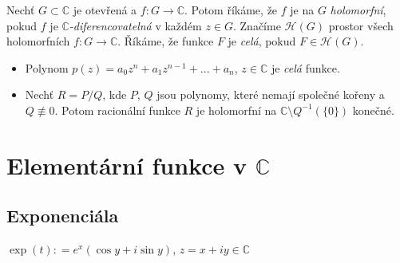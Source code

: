 
\begin{definition}
Nechť $G\subset \mathbb{C}$ je otevřená a $f \colon G \to \mathbb{C}$.
Potom říkáme, že $f$ je na $G$ \emph{holomorfní}, pokud $f$ je  $\mathbb{C}$\emph{-diferencovatelná} v každém $z\in {G}$. Značíme $\mathcal{H}(G)$ prostor všech holomorfních $f \colon G \to \mathbb{C}$. Říkáme, že funkce $F$ je \emph{celá}, pokud $F\in \mathcal{H}(G)$.
\end{definition}

\begin{example}\mbox{}
\begin{itemize}
    \item Polynom $p(z) = a_0z^{n}+a_1z^{n-1}+...+a_n$, $z\in \mathbb{C}$ je \emph{celá} funkce.
    \item Nechť $R=P/Q$, kde $P$, $Q$ jsou polynomy, které nemají společné kořeny a $Q\not\equiv 0$. Potom racionální funkce $R$ je holomorfní na $\mathbb{C}\setminus Q^{-1}(\{0\})$ konečné.
\end{itemize}    
\end{example}


\section{Elementární funkce v \texorpdfstring{$\mathbb{C}$}{C}}
\subsection{Exponenciála}

\begin{definition}
$\exp(t)\colon=e^{x}(\cos y + i\sin y)$, $z=x+i y\in \mathbb{C}$
\end{definition}

